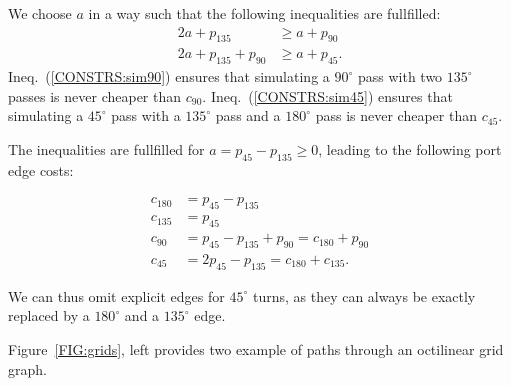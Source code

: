\documentclass{sig-alternate-sigmod09}
\begin{document}
We choose $a$ in a way such that the following inequalities are fullfilled:
\begin{align}
2a + p_{135} &\geq a + p_{90} \label{CONSTRS:sim90}\\
2a + p_{135} + p_{90} &\geq a + p_{45}\label{CONSTRS:sim45}.
\end{align}
Ineq.~(\ref{CONSTRS:sim90}) ensures that simulating a $90^{\circ}$ pass with two $135^{\circ}$ passes is never cheaper than $c_{90}$. Ineq.~(\ref{CONSTRS:sim45}) ensures that simulating a $45^{\circ}$ pass with a $135^{\circ}$ pass and a $180^{\circ}$ pass is never cheaper than $c_{45}$.

The inequalities are fullfilled for $a = p_{45} - p_{135} \geq 0$, leading to the following port edge costs:

\begin{align}
c_{180} &= p_{45} - p_{135} \\
c_{135} &= p_{45} \\
c_{90} &= p_{45} - p_{135} + p_{90} = c_{180} + p_{90} \\
c_{45} &= 2 p_{45} - p_{135} = c_{180} + c_{135}.
\end{align}

We can thus omit explicit edges for $45^{\circ}$ turns, as they can always be exactly replaced by a $180^{\circ}$ and a $135^{\circ}$ edge.

Figure~\ref{FIG:grids}, left provides two example of paths through an octilinear grid graph.
\end{document}
